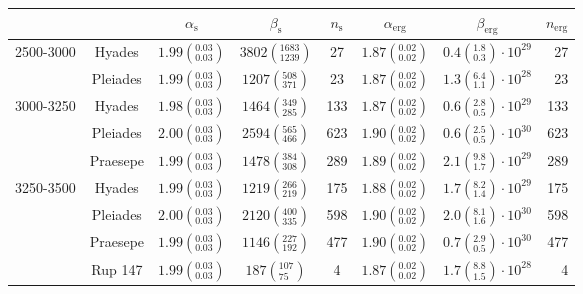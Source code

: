 \begin{tabular}{lccccccr}
\hline
          &         &                $\alpha_\mathrm{s}$ &                 $\beta_\mathrm{s}$ & $n_\mathrm{s}$ &              $\alpha_\mathrm{erg}$ &                          $\beta_\mathrm{erg}$ & $n_\mathrm{erg}$ \\
\hline
2500-3000 & Hyades &  $1.99\left(^{0.03}_{0.03}\right)$ &  $3802\left(^{1683}_{1239}\right)$ &             27 &  $1.87\left(^{0.02}_{0.02}\right)$ &   $0.4\left(^{1.8}_{0.3}\right)\cdot 10^{29}$ &               27 \\
          & Pleiades &  $1.99\left(^{0.03}_{0.03}\right)$ &    $1207\left(^{508}_{371}\right)$ &             23 &  $1.87\left(^{0.02}_{0.02}\right)$ &   $1.3\left(^{6.4}_{1.1}\right)\cdot 10^{28}$ &               23 \\
3000-3250 & Hyades &  $1.98\left(^{0.03}_{0.03}\right)$ &    $1464\left(^{349}_{285}\right)$ &            133 &  $1.87\left(^{0.02}_{0.02}\right)$ &   $0.6\left(^{2.8}_{0.5}\right)\cdot 10^{29}$ &              133 \\
          & Pleiades &  $2.00\left(^{0.03}_{0.03}\right)$ &    $2594\left(^{565}_{466}\right)$ &            623 &  $1.90\left(^{0.02}_{0.02}\right)$ &   $0.6\left(^{2.5}_{0.5}\right)\cdot 10^{30}$ &              623 \\
          & Praesepe &  $1.99\left(^{0.03}_{0.03}\right)$ &    $1478\left(^{384}_{308}\right)$ &            289 &  $1.89\left(^{0.02}_{0.02}\right)$ &   $2.1\left(^{9.8}_{1.7}\right)\cdot 10^{29}$ &              289 \\
3250-3500 & Hyades &  $1.99\left(^{0.03}_{0.03}\right)$ &    $1219\left(^{266}_{219}\right)$ &            175 &  $1.88\left(^{0.02}_{0.02}\right)$ &   $1.7\left(^{8.2}_{1.4}\right)\cdot 10^{29}$ &              175 \\
          & Pleiades &  $2.00\left(^{0.03}_{0.03}\right)$ &    $2120\left(^{400}_{335}\right)$ &            598 &  $1.90\left(^{0.02}_{0.02}\right)$ &   $2.0\left(^{8.1}_{1.6}\right)\cdot 10^{30}$ &              598 \\
          & Praesepe &  $1.99\left(^{0.03}_{0.03}\right)$ &    $1146\left(^{227}_{192}\right)$ &            477 &  $1.90\left(^{0.02}_{0.02}\right)$ &   $0.7\left(^{2.9}_{0.5}\right)\cdot 10^{30}$ &              477 \\
          & Rup 147 &  $1.99\left(^{0.03}_{0.03}\right)$ &      $187\left(^{107}_{75}\right)$ &              4 &  $1.87\left(^{0.02}_{0.02}\right)$ &   $1.7\left(^{8.8}_{1.5}\right)\cdot 10^{28}$ &                4 \\

\end{tabular}
